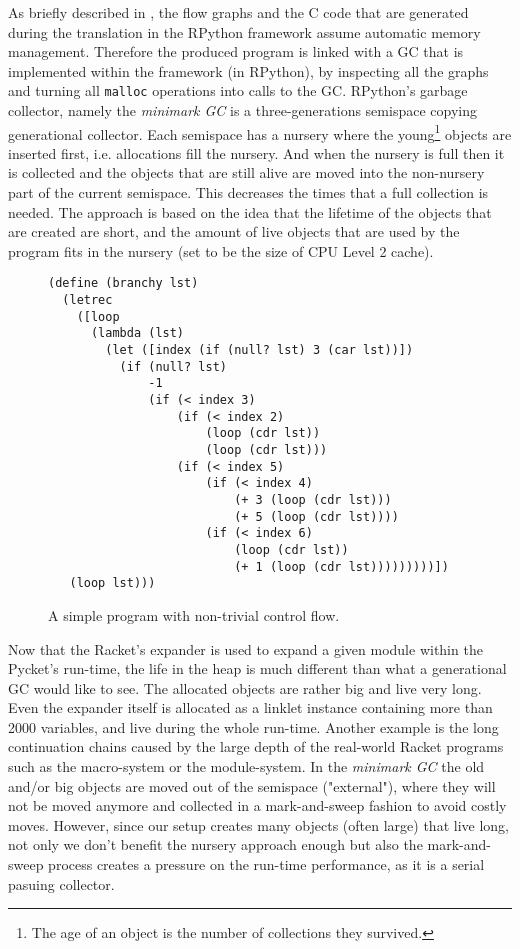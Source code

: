As briefly described in , the flow graphs and
the C code that are generated during the translation in the RPython
framework assume automatic memory management. Therefore the produced
program is linked with a GC that is implemented within the framework
(in RPython), by inspecting all the graphs and turning all
\texttt{malloc} operations into calls to the GC. RPython's garbage
collector, namely the \emph{minimark GC} is a three-generations
semispace copying generational collector. Each semispace has a nursery
where the young\footnote{The age of an object is the number of
  collections they survived.}  objects are inserted first,
i.e. allocations fill the nursery. And when the nursery is full then
it is collected and the objects that are still alive are moved into
the non-nursery part of the current semispace. This decreases the
times that a full collection is needed. The approach is based on the
idea that the lifetime of the objects that are created are short, and
the amount of live objects that are used by the program fits in the
nursery (set to be the size of CPU Level 2 cache). \cite{pypy06,
  bolz:14, gc:16, gc:12}

\begin{wrapfigure}[19]{l}{0.5\textwidth}
  \vspace{-0.5cm}
\small
\begin{lstlisting}[mathescape]
(define (branchy lst)
  (letrec
    ([loop
      (lambda (lst)
        (let ([index (if (null? lst) 3 (car lst))])
          (if (null? lst)
              -1
              (if (< index 3)
                  (if (< index 2)
                      (loop (cdr lst))
                      (loop (cdr lst)))
                  (if (< index 5)
                      (if (< index 4)
                          (+ 3 (loop (cdr lst)))
                          (+ 5 (loop (cdr lst))))
                      (if (< index 6)
                          (loop (cdr lst))
                          (+ 1 (loop (cdr lst)))))))))])
   (loop lst)))
\end{lstlisting}
\caption{A simple program with non-trivial control flow.}
\label{fig:branchy}
\end{wrapfigure}

Now that the Racket's expander is used to expand a given module within
the Pycket's run-time, the life in the heap is much different than
what a generational GC would like to see. The allocated objects are
rather big and live very long. Even the expander itself is allocated
as a linklet instance containing more than 2000 variables, and live
during the whole run-time. Another example is the long continuation
chains caused by the large depth of the real-world Racket programs
such as the macro-system or the module-system. In the \emph{minimark
  GC} the old and/or big objects are moved out of the semispace
("external"), where they will not be moved anymore and collected in a
mark-and-sweep fashion to avoid costly moves. However, since our setup
creates many objects (often large) that live long, not only we don't
benefit the nursery approach enough but also the mark-and-sweep
process creates a pressure on the run-time performance, as it is a
serial pasuing collector.

